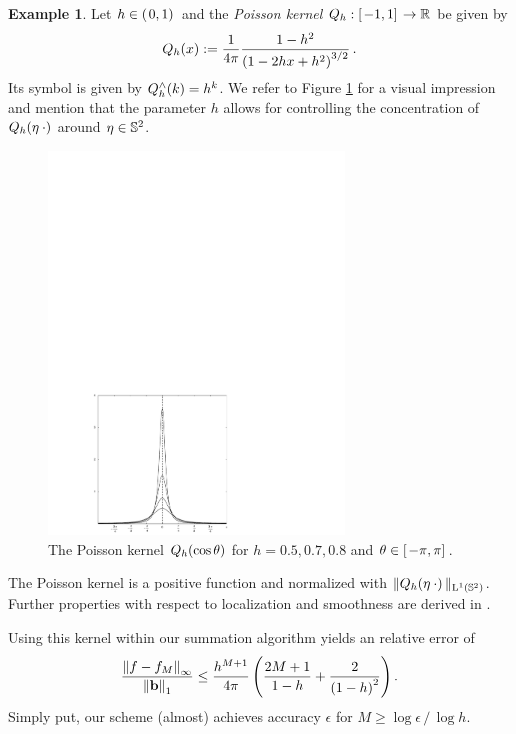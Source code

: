 \documentclass[11pt,a4paper,twoside,bibtotoc]{scrartcl}
\theoremstyle{plain}
\theoremstyle{definition}
\newtheorem{example}[theorem]{Example}
\theoremstyle{remark}
\numberwithin{equation}{section}
\numberwithin{table}{section}
\numberwithin{figure}{section}
\begin{document}
\begin{example}
  Let $h \in \left(\left.0,1\right)\right.$ and the \emph{Poisson kernel}
  $Q_{h}:\left[\left.-1,1\right]\right. \rightarrow \mathbb{R}$ be given by
  \begin{equation}
    \label{PoissonKernel}
    \nonumber
    Q_{h}{\hspace{-0.4ex}}\left(x\right) := \frac{1}{4\pi} \frac{1-h^2}{\left(1-2hx+h^2\right)^{3/2}}\,.
  \end{equation}
  Its symbol is given by $Q_{h}^{\wedge}{\hspace{-0.4ex}}\left(k\right)=h^k$.
  We refer to Figure \ref{Basics:Figure:PoissonKernel} for a visual impression
  and mention that the parameter $h$ allows for controlling the concentration
  of $Q_{h}{\hspace{-0.4ex}}\left(\mathbf{\eta} \: \cdot\right)$ around $\eta \in \mathbb{S}^2$.
  \begin{figure}[tbp]
    \centering
    \includegraphics[width=0.7\textwidth]{images/poisson}
    \caption{The Poisson kernel $Q_{h}{\hspace{-0.4ex}}\left(\cos\theta\right)$ for $h =
    0.5,0.7,0.8$ and  $\theta \in \left[\left.-\pi,\pi\right]\right.$.}
    \label{Basics:Figure:PoissonKernel}
  \end{figure}
  The Poisson kernel is a positive function and normalized with
  $\|Q_{h}{\hspace{-0.4ex}}\left(\mathbf{\eta} \: \cdot\right)\|_{\text{\rm{L}}^{1}\left(\mathbb{S}^2\right)}$.
  Further properties with respect to localization and smoothness are derived
  in \cite[pp. 112]{frgesc}.

  Using this kernel within our summation algorithm yields an relative error of
  \begin{equation}
    \label{error:poisson}
    \frac{\left\|f - f_{M}\right\|_{\infty}}{\left\|\mathbf{b}\right\|_1} \le
    \frac{h^{M+1}}{4\pi} \left(\frac{2M+1}{1-h}+\frac{2}{\left(1-h\right)^2}\right).
  \end{equation}
  Simply put, our scheme (almost) achieves accuracy $\epsilon$ for $M \ge \log\epsilon \,
  / \, \log h$.
\end{example}
\end{document}
